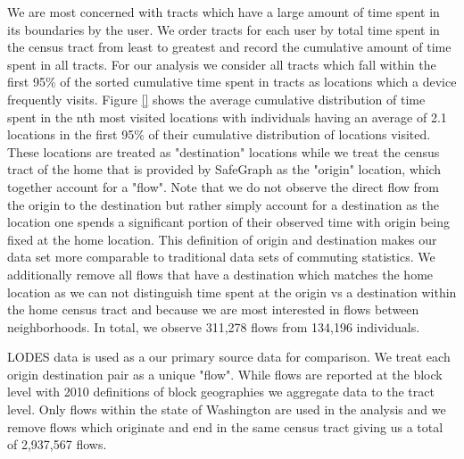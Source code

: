 \documentclass[fleqn,10pt]{olplainarticle}
\begin{document}
We are most concerned with tracts which have a large amount of time spent in its boundaries by the user. We order tracts for each user by total time spent in the census tract from least to greatest and record the cumulative amount of time spent in all tracts. For our analysis we consider all tracts which fall within the first 95\% of the sorted cumulative time spent in tracts as locations which a device frequently visits. Figure \ref{} shows the average cumulative distribution of time spent in the nth most visited locations with individuals having an average of 2.1 locations in the first 95\% of their cumulative distribution of locations visited. These locations are treated as "destination" locations while we treat the census tract of the home that is provided by SafeGraph as the "origin" location, which together account for a "flow". Note that we do not observe the direct flow from the origin to the destination but rather simply account for a destination as the location one spends a significant portion of their observed time with origin being fixed at the home location. This definition of origin and destination makes our data set more comparable to traditional data sets of commuting statistics. We additionally remove all flows that have a destination which matches the home location as we can not distinguish time spent at the origin vs a destination within the home census tract and because we are most interested in flows between neighborhoods. In total, we observe 311,278 flows from 134,196 individuals.

LODES data is used as a our primary source data for comparison. We treat each origin destination pair as a unique "flow". While flows are reported at the block level with 2010 definitions of block geographies we aggregate data to the tract level. Only flows within the state of Washington are used in the analysis and we remove flows which originate and end in the same census tract giving us a total of 2,937,567 flows.
\end{document}

